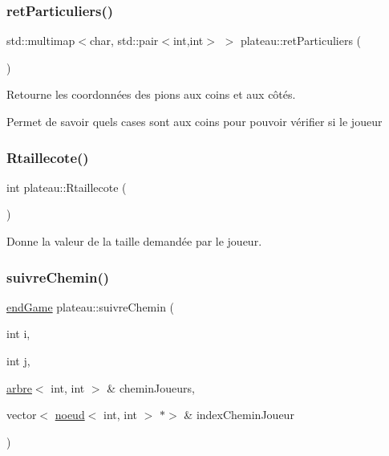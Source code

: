 \subsubsection{\texorpdfstring{ret\+Particuliers()}{retParticuliers()}}
{\footnotesize\ttfamily std\+::multimap$<$char, std\+::pair$<$int,int$>$ $>$ plateau\+::ret\+Particuliers (\begin{DoxyParamCaption}{ }\end{DoxyParamCaption})}



Retourne les coordonnées des pions aux coins et aux côtés. 

Permet de savoir quels cases sont aux coins pour pouvoir vérifier si le joueur \mbox{\label{classplateau_ae9917aadf7efa09d855f98477da9e6f2}} 
\subsubsection{\texorpdfstring{Rtaillecote()}{Rtaillecote()}}
{\footnotesize\ttfamily int plateau\+::\+Rtaillecote (\begin{DoxyParamCaption}{ }\end{DoxyParamCaption})\hspace{0.3cm}{\ttfamily [inline]}}



Donne la valeur de la taille demandée par le joueur. 

\mbox{\label{classplateau_accb292e7cf7ffd0df0fe4cec587ed5f7}} 
\subsubsection{\texorpdfstring{suivre\+Chemin()}{suivreChemin()}\hspace{0.1cm}{\footnotesize\ttfamily [1/2]}}
{\footnotesize\ttfamily \hyperlink{classplateau_a94b54e0a84c850657a83176f812db222}{end\+Game} plateau\+::suivre\+Chemin (\begin{DoxyParamCaption}\item[{int}]{i,  }\item[{int}]{j,  }\item[{\hyperlink{classarbre}{arbre}$<$ int, int $>$ \&}]{chemin\+Joueurs,  }\item[{vector$<$ \hyperlink{classnoeud}{noeud}$<$ int, int $>$ $\ast$$>$ \&}]{index\+Chemin\+Joueur }\end{DoxyParamCaption})}



